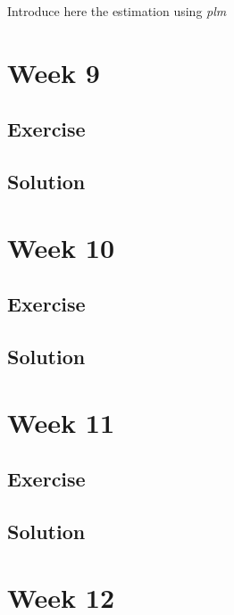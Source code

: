 \documentclass[
]{book}
\begin{document}
{Introduce here the estimation using \emph{plm} }

\hypertarget{week-9}{%
\chapter{Week 9}\label{week-9}}

\hypertarget{exercise-5}{%
\section{Exercise}\label{exercise-5}}

\hypertarget{solution-4}{%
\section{Solution}\label{solution-4}}

\hypertarget{week-10}{%
\chapter{Week 10}\label{week-10}}

\hypertarget{exercise-6}{%
\section{Exercise}\label{exercise-6}}

\hypertarget{solution-5}{%
\section{Solution}\label{solution-5}}

\hypertarget{week-11}{%
\chapter{Week 11}\label{week-11}}

\hypertarget{exercise-7}{%
\section{Exercise}\label{exercise-7}}

\hypertarget{solution-6}{%
\section{Solution}\label{solution-6}}

\hypertarget{week-12}{%
\chapter{Week 12}\label{week-12}}
\end{document}
